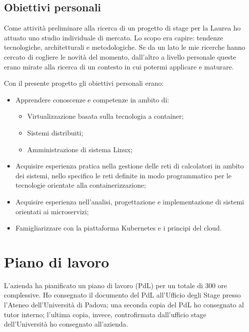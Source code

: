 \subsection{Obiettivi personali}
Come attività preliminare alla ricerca di un progetto di stage per la Laurea ho 
attuato uno studio individuale di mercato. Lo scopo era capire: tendenze 
tecnologiche, architetturali e metodologiche. Se da un lato le mie ricerche 
hanno cercato di cogliere le novità del momento, dall'altro a livello personale 
queste erano mirate alla ricerca di un contesto in cui potermi applicare e 
maturare. 

Con il presente progetto gli obiettivi personali erano:

\begin{itemize}
	\item Apprendere conoscenze e competenze in ambito di:
		\begin{itemize}
			\item Virtualizzazione basata sulla tecnologia a 
container; 
			\item Sistemi distribuiti;
			\item Amministrazione di sistema Linux;
	    \end{itemize}
	\item Acquisire esperienza pratica nella gestione delle reti di 
calcolatori in ambito dei sistemi, nello specifico le reti definite in modo 
programmatico per le tecnologie orientate alla containerizzazione; 
	\item Acquisire esperienza nell'analisi, progettazione e 
implementazione di sistemi orientati ai microservizi;
	\item Famigliarizzare con la piattaforma Kubernetes e i principi del 
\gls{cloud}.
\end{itemize} 

\section{Piano di lavoro}
\label{sec:piano-di-lavoro}
L'azienda ha pianificato un piano di lavoro (PdL) per un totale di 300 ore 
complessive. 
Ho consegnato il documento del PdL all'Ufficio degli Stage presso l'Ateneo 
dell'Università di Padova; una seconda copia del PdL ho consegnato al tutor 
interno; l'ultima copia, invece, 
controfirmata dall'ufficio stage dell'Università ho consegnato all'azienda.


